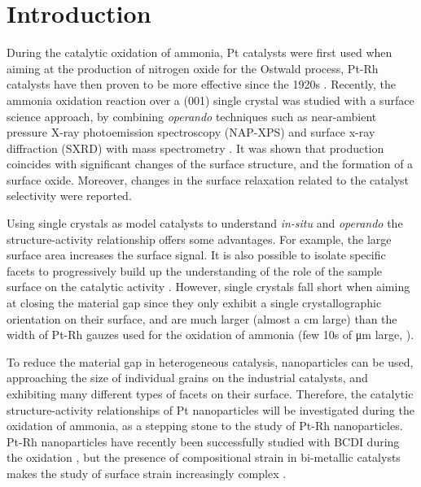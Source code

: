 \section{Introduction}

During the catalytic oxidation of ammonia, Pt catalysts were first used when aiming at the production of nitrogen oxide for the Ostwald process, Pt-Rh catalysts have then proven to be more effective since the 1920s \parencite{Handforth1934, Heck1982}.
Recently, the ammonia oxidation reaction over a (001) single crystal was studied with a surface science approach, by combining \textit{operando} techniques such as near-ambient pressure X-ray photoemission spectroscopy (NAP-XPS) and surface x-ray diffraction (SXRD) with mass spectrometry \parencite{Resta2020a}.
It was shown that  production coincides with significant changes of the surface structure, and the formation of a  surface oxide.
Moreover, changes in the surface relaxation related to the catalyst selectivity were reported.

Using single crystals as model catalysts to understand \textit{in-situ} and \textit{operando} the structure-activity relationship offers some advantages.
For example, the large surface area increases the surface signal.
It is also possible to isolate specific facets to progressively build up the understanding of the role of the sample surface on the catalytic activity \parencite{Hejral2016, Resta2020a}.
However, single crystals fall short when aiming at closing the material gap since they only exhibit a single crystallographic orientation on their surface, and are much larger (almost a \unit{cm} large) than the width of Pt-Rh gauzes used for the oxidation of ammonia (few 10s of \unit{\micro\meter} large, \cite{Kaiser1909}).

To reduce the material gap in heterogeneous catalysis, nanoparticles can be used, approaching the size of individual grains on the industrial catalysts, and exhibiting many different types of facets on their surface.
Therefore, the catalytic structure-activity relationships of Pt nanoparticles will be investigated during the oxidation of ammonia, as a stepping stone to the study of Pt-Rh nanoparticles.
Pt-Rh nanoparticles have recently been successfully studied with BCDI during the  oxidation \parencite{Kim2021}, but the presence of compositional strain in bi-metallic catalysts makes the study of surface strain increasingly complex \parencite{Kawaguchi2019}.

